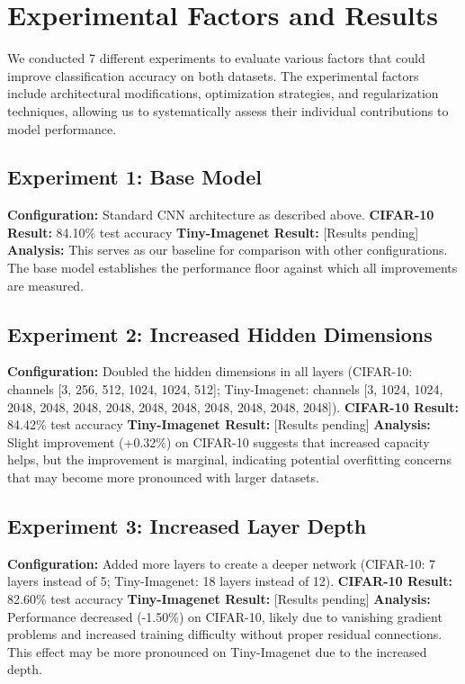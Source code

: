 \documentclass{article}
\begin{document}
\section{Experimental Factors and Results}

We conducted 7 different experiments to evaluate various factors that could improve classification accuracy on both datasets. The experimental factors include architectural modifications, optimization strategies, and regularization techniques, allowing us to systematically assess their individual contributions to model performance.

\subsection{Experiment 1: Base Model}
\textbf{Configuration:} Standard CNN architecture as described above.
\textbf{CIFAR-10 Result:} 84.10\% test accuracy
\textbf{Tiny-Imagenet Result:} [Results pending]
\textbf{Analysis:} This serves as our baseline for comparison with other configurations. The base model establishes the performance floor against which all improvements are measured.

\subsection{Experiment 2: Increased Hidden Dimensions}
\textbf{Configuration:} Doubled the hidden dimensions in all layers (CIFAR-10: channels [3, 256, 512, 1024, 1024, 512]; Tiny-Imagenet: channels [3, 1024, 1024, 2048, 2048, 2048, 2048, 2048, 2048, 2048, 2048, 2048, 2048]).
\textbf{CIFAR-10 Result:} 84.42\% test accuracy
\textbf{Tiny-Imagenet Result:} [Results pending]
\textbf{Analysis:} Slight improvement (+0.32\%) on CIFAR-10 suggests that increased capacity helps, but the improvement is marginal, indicating potential overfitting concerns that may become more pronounced with larger datasets.

\subsection{Experiment 3: Increased Layer Depth}
\textbf{Configuration:} Added more layers to create a deeper network (CIFAR-10: 7 layers instead of 5; Tiny-Imagenet: 18 layers instead of 12).
\textbf{CIFAR-10 Result:} 82.60\% test accuracy
\textbf{Tiny-Imagenet Result:} [Results pending]
\textbf{Analysis:} Performance decreased (-1.50\%) on CIFAR-10, likely due to vanishing gradient problems and increased training difficulty without proper residual connections. This effect may be more pronounced on Tiny-Imagenet due to the increased depth.
\end{document}
